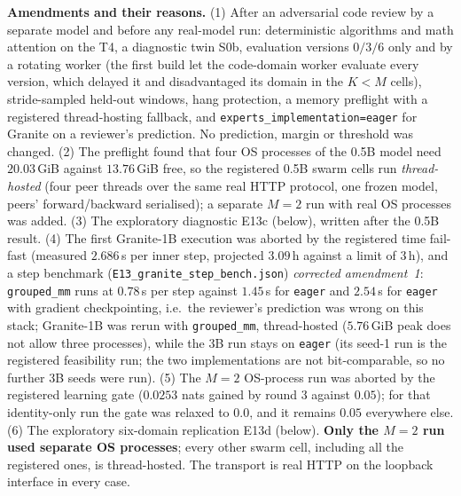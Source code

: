 \documentclass[11pt,a4paper]{article}
\begin{document}
\textbf{Amendments and their reasons.} (1) After an adversarial code review by a separate model and before any real-model run: deterministic algorithms and math attention on the T4, a diagnostic twin S0b, evaluation versions $0/3/6$ only and by a rotating worker (the first build let the code-domain worker evaluate every version, which delayed it and disadvantaged its domain in the $K<M$ cells), stride-sampled held-out windows, hang protection, a memory preflight with a registered thread-hosting fallback, and \texttt{experts\_implementation=eager} for Granite on a reviewer's prediction. No prediction, margin or threshold was changed. (2) The preflight found that four OS processes of the 0.5B model need $20.03$\,GiB against $13.76$\,GiB free, so the registered 0.5B swarm cells run \emph{thread-hosted} (four peer threads over the same real HTTP protocol, one frozen model, peers' forward/backward serialised); a separate $M=2$ run with real OS processes was added. (3) The exploratory diagnostic E13c (below), written after the 0.5B result. (4) The first Granite-1B execution was aborted by the registered time fail-fast (measured $2.686$\,s per inner step, projected $3.09$\,h against a limit of $3$\,h), and a step benchmark (\texttt{E13\_granite\_step\_bench.json}) \emph{corrected amendment~1}: \texttt{grouped\_mm} runs at $0.78$\,s per step against $1.45$\,s for \texttt{eager} and $2.54$\,s for \texttt{eager} with gradient checkpointing, i.e.\ the reviewer's prediction was wrong on this stack; Granite-1B was rerun with \texttt{grouped\_mm}, thread-hosted ($5.76$\,GiB peak does not allow three processes), while the 3B run stays on \texttt{eager} (its seed-1 run is the registered feasibility run; the two implementations are not bit-comparable, so no further 3B seeds were run). (5) The $M=2$ OS-process run was aborted by the registered learning gate ($0.0253$ nats gained by round 3 against $0.05$); for that identity-only run the gate was relaxed to $0.0$, and it remains $0.05$ everywhere else. (6) The exploratory six-domain replication E13d (below). \textbf{Only the $M=2$ run used separate OS processes}; every other swarm cell, including all the registered ones, is thread-hosted. The transport is real HTTP on the loopback interface in every case.
\end{document}
